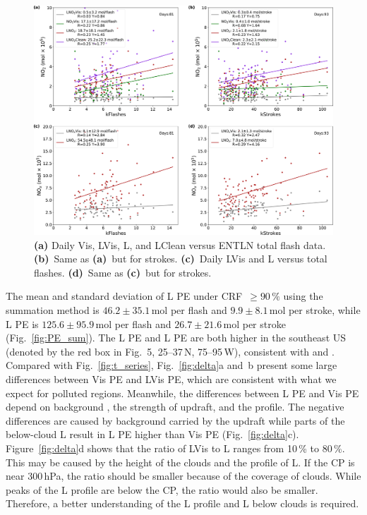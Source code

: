\documentclass[amt]{copernicus}
\begin{document}
\begin{figure}[t]
    \includegraphics[width=15cm]{amt-2019-372-f04.png}
    \caption{\textbf{(a)} Daily Vis, LVis, L, and LClean versus ENTLN total flash data. \textbf{(b)}~Same as \textbf{(a)}~but for strokes. \textbf{(c)}~Daily LVis and L versus total flashes. \textbf{(d)}~Same as \textbf{(c)}~but for strokes.}
    \label{fig:PE_linear}
\end{figure}

The mean and standard deviation of L PE under CRF~$\geq 90\,{\%}$ using the summation method is $46.2 \pm 35.1$\,mol per flash and $9.9 \pm 8.1$\,mol per stroke, while L PE is $125.6 \pm 95.9$\,mol per flash and $26.7 \pm 21.6$\,mol per stroke (Fig.~\ref{fig:PE_sum}).
The L PE and L PE are both higher in the southeast US (denoted by the red box in Fig.~5, 25--37{\degree}\,N, 75--95{\degree}\,W), consistent with \citet{Lapierre.2020} and \citet{Bucsela.2019}.
Compared with Fig.~\ref{fig:t_series}, Fig.~\ref{fig:delta}a and~b present some large differences between Vis PE and LVis PE, which are consistent with what we expect for polluted regions.
Meanwhile, the differences between L PE and Vis PE depend on background , the strength of updraft, and the profile.
The negative differences are caused by background  carried by the updraft while parts of the below-cloud L result in L PE higher than Vis PE (Fig.~\ref{fig:delta}c).
Figure~\ref{fig:delta}d shows that the ratio of LVis to L ranges from 10\,{\%} to 80\,{\%}.
This may be caused by the height of the clouds and the profile of L.
If the CP is near 300\,hPa, the ratio should be smaller because of the coverage of clouds.
While peaks of the L profile are below the CP, the ratio would also be smaller.
Therefore, a better understanding of the L profile and L below clouds is required.
\end{document}

